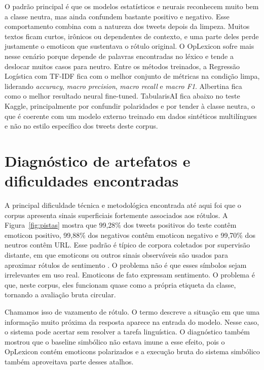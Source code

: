 \documentclass[11pt,a4paper]{article}
\begin{document}
O padrão principal é que os modelos estatísticos e neurais reconhecem muito bem a classe neutra, mas ainda confundem bastante positivo e negativo. Esse comportamento combina com a natureza dos tweets depois da limpeza. Muitos textos ficam curtos, irônicos ou dependentes de contexto, e uma parte deles perde justamente o emoticon que sustentava o rótulo original. O OpLexicon sofre mais nesse cenário porque depende de palavras encontradas no léxico e tende a deslocar muitos casos para neutro. Entre os métodos treinados, a Regressão Logística com TF-IDF fica com o melhor conjunto de métricas na condição limpa, liderando \emph{accuracy}, \emph{macro precision}, \emph{macro recall} e \emph{macro F1}. Albertina fica como o melhor resultado neural fine-tuned. TabularisAI fica abaixo no teste Kaggle, principalmente por confundir polaridades e por tender à classe neutra, o que é coerente com um modelo externo treinado em dados sintéticos multilíngues e não no estilo específico dos tweets deste corpus.
\FloatBarrier

\section{Diagnóstico de artefatos e dificuldades encontradas}

A principal dificuldade técnica e metodológica encontrada até aqui foi que o corpus apresenta sinais superficiais fortemente associados aos rótulos. A Figura~\ref{fig:pistas} mostra que 99,28\% dos tweets positivos do teste contêm emoticon positivo, 99,88\% dos negativos contêm emoticon negativo e 99,70\% dos neutros contêm URL. Esse padrão é típico de corpora coletados por supervisão distante, em que emoticons ou outros sinais observáveis são usados para aproximar rótulos de sentimento \citep{go2009distant,wang2015emoticons,yin2021emojification}. O problema não é que esses símbolos sejam irrelevantes em uso real. Emoticons de fato expressam sentimento. O problema é que, neste corpus, eles funcionam quase como a própria etiqueta da classe, tornando a avaliação bruta circular.

Chamamos isso de vazamento de rótulo. O termo descreve a situação em que uma informação muito próxima da resposta aparece na entrada do modelo. Nesse caso, o sistema pode acertar sem resolver a tarefa linguística. O diagnóstico também mostrou que o baseline simbólico não estava imune a esse efeito, pois o OpLexicon contém emoticons polarizados e a execução bruta do sistema simbólico também aproveitava parte desses atalhos.
\end{document}
